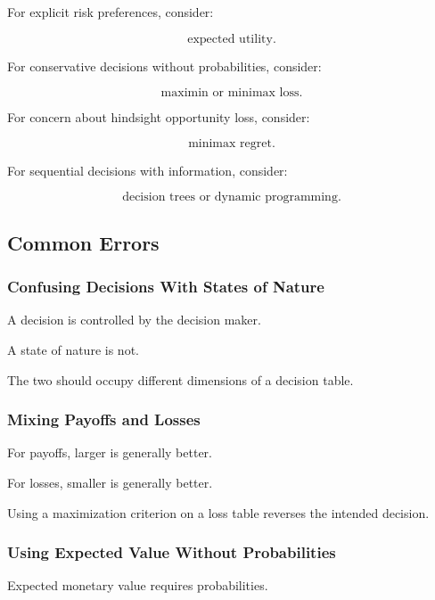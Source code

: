 For explicit risk preferences, consider:

\[
\boxed{
\text{expected utility}.
}
\]

For conservative decisions without probabilities, consider:

\[
\boxed{
\text{maximin or minimax loss}.
}
\]

For concern about hindsight opportunity loss, consider:

\[
\boxed{
\text{minimax regret}.
}
\]

For sequential decisions with information, consider:

\[
\boxed{
\text{decision trees or dynamic programming}.
}
\]

\subsection{Common Errors}
\label{subsec:decision-theory-common-errors}

\subsubsection{Confusing Decisions With States of Nature}

A decision is controlled by the decision maker.

A state of nature is not.

The two should occupy different dimensions of a decision table.

\subsubsection{Mixing Payoffs and Losses}

For payoffs, larger is generally better.

For losses, smaller is generally better.

Using a maximization criterion on a loss table reverses the intended
decision.

\subsubsection{Using Expected Value Without Probabilities}

Expected monetary value requires probabilities.

